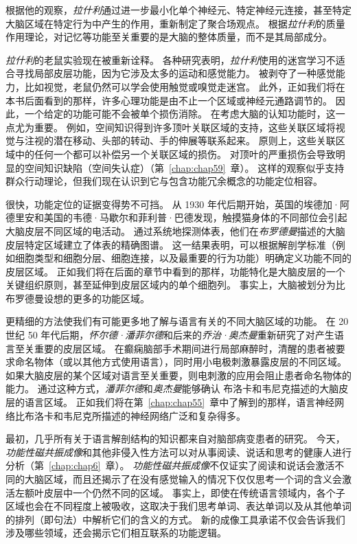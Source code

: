根据他的观察，\textit{拉什利}通过进一步最小化单个神经元、特定神经元连接，甚至特定大脑区域在特定行为中产生的作用，重新制定了聚合场观点。
根据\textit{拉什利}的质量作用理论，对记忆等功能至关重要的是大脑的整体质量，而不是其局部成分。


\textit{拉什利}的老鼠实验现在被重新诠释。
各种研究表明，\textit{拉什利}使用的迷宫学习不适合寻找局部皮层功能，因为它涉及太多的运动和感觉能力。
被剥夺了一种感觉能力，比如视觉，老鼠仍然可以学会使用触觉或嗅觉走迷宫。
此外，正如我们将在本书后面看到的那样，许多心理功能是由不止一个区域或神经元通路调节的。
因此，一个给定的功能可能不会被单个损伤消除。
在考虑大脑的认知功能时，这一点尤为重要。
例如，空间知识得到许多顶叶关联区域的支持，这些关联区域将视觉与注视的潜在移动、头部的转动、手的伸展等联系起来。
原则上，这些关联区域中的任何一个都可以补偿另一个关联区域的损伤。
对顶叶的严重损伤会导致明显的空间知识缺陷（空间失认症）（第~\ref{chap:chap59}~章）。
这样的观察似乎支持群众行动理论，但我们现在认识到它与包含功能冗余概念的功能定位相容。


很快，功能定位的证据变得势不可挡。
从 1930 年代后期开始，英国的埃德加·阿德里安和美国的韦德·马歇尔和菲利普·巴德发现，触摸猫身体的不同部位会引起大脑皮层不同区域的电活动。
通过系统地探测体表，他们在\textit{布罗德曼}描述的大脑皮层特定区域建立了体表的精确图谱。
这一结果表明，可以根据解剖学标准（例如细胞类型和细胞分层、细胞连接，以及最重要的行为功能）明确定义功能不同的皮层区域。
正如我们将在后面的章节中看到的那样，功能特化是大脑皮层的一个关键组织原则，甚至延伸到皮层区域内的单个细胞列。
事实上，大脑被划分为比布罗德曼设想的更多的功能区域。


更精细的方法使我们有可能更多地了解与语言有关的不同大脑区域的功能。
在 20 世纪 50 年代后期，\textit{怀尔德·潘菲尔德}和后来的\textit{乔治·奥杰曼}重新研究了对产生语言至关重要的皮层区域。
在癫痫脑部手术期间进行局部麻醉时，清醒的患者被要求命名物体（或以其他方式使用语言），同时用小电极刺激暴露皮层的不同区域。
如果大脑皮层的某个区域对语言至关重要，则电刺激的应用会阻止患者命名物体的能力。
通过这种方式，\textit{潘菲尔德}和\textit{奥杰曼}能够确认 布洛卡和韦尼克描述的大脑皮层的语言区域。
正如我们将在第~\ref{chap:chap55}~章中了解到的那样，语言神经网络比布洛卡和韦尼克所描述的神经网络广泛和复杂得多。


最初，几乎所有关于语言解剖结构的知识都来自对脑部病变患者的研究。
今天，\textit{功能性磁共振成像}和其他非侵入性方法可以对从事阅读、说话和思考的健康人进行分析（第~\ref{chap:chap6}~章）。
\textit{功能性磁共振成像}不仅证实了阅读和说话会激活不同的大脑区域，而且还揭示了在没有感觉输入的情况下仅仅思考一个词的含义会激活左额叶皮层中一个仍然不同的区域。
事实上，即使在传统语言领域内，各个子区域也会在不同程度上被吸收，这取决于我们思考单词、表达单词以及从其他单词的排列（即句法）中解析它们的含义的方式。
新的成像工具承诺不仅会告诉我们涉及哪些领域，还会揭示它们相互联系的功能逻辑。


